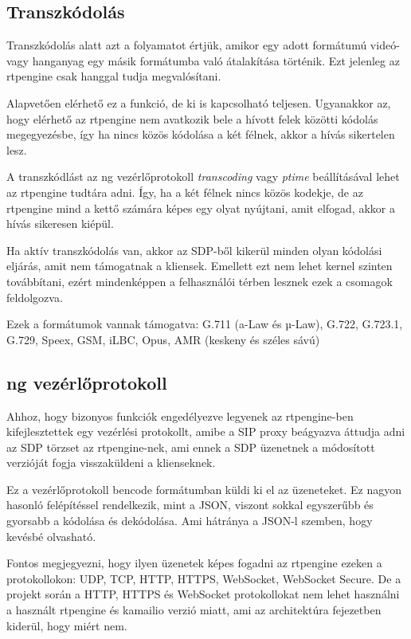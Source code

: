 \subsection{Transzkódolás}

Transzkódolás alatt azt a folyamatot értjük, amikor egy adott formátumú videó- vagy 
hanganyag egy másik formátumba való átalakítása történik. Ezt jelenleg az rtpengine 
csak hanggal tudja megvalósítani. 

Alapvetően elérhető ez a funkció, de ki is kapcsolható teljesen. Ugyanakkor az, hogy 
elérhető az rtpengine nem avatkozik bele a hívott felek közötti kódolás megegyezésbe, 
így ha nincs közös kódolása a két félnek, akkor a hívás sikertelen lesz.

A transzkódlást az ng vezérlőprotokoll \textit{transcoding} vagy \textit{ptime} beállításával
lehet az rtpengine tudtára adni. Így, ha a két félnek nincs közös kodekje, de az rtpengine
mind a kettő számára képes egy olyat nyújtani, amit elfogad, akkor a hívás sikeresen kiépül.

Ha aktív transzkódolás van, akkor az SDP-ből kikerül minden olyan kódolási eljárás, amit nem támogatnak
a kliensek. Emellett ezt nem lehet kernel szinten továbbítani, ezért mindenképpen a 
felhasználói térben lesznek ezek a csomagok feldolgozva.

Ezek a formátumok vannak támogatva: G.711 (a-Law és µ-Law), G.722, G.723.1, G.729, Speex, 
GSM, iLBC, Opus, AMR (keskeny és széles sávú)

\subsection{ng vezérlőprotokoll}

Ahhoz, hogy bizonyos funkciók engedélyezve legyenek az rtpengine-ben kifejlesztettek 
egy vezérlési protokollt, amibe a SIP proxy beágyazva áttudja adni az SDP törzset 
az rtpengine-nek, ami ennek a SDP üzenetnek a módosított verzióját fogja visszaküldeni
a klienseknek.

Ez a vezérlőprotokoll bencode formátumban küldi ki el az üzeneteket. Ez nagyon hasonló
felépítéssel rendelkezik, mint a JSON, viszont sokkal egyszerűbb és gyorsabb a kódolása 
és dekódolása. Ami hátránya a JSON-l szemben, hogy kevésbé olvasható.

Fontos megjegyezni, hogy ilyen üzenetek képes fogadni az rtpengine ezeken a protokollokon: 
UDP, TCP, HTTP, HTTPS, WebSocket, WebSocket Secure. De a projekt során a HTTP, HTTPS és 
WebSocket protokollokat nem lehet használni a használt rtpengine és kamailio 
verzió miatt, ami az architektúra fejezetben kiderül, hogy miért nem.

